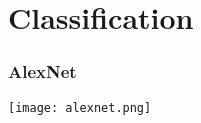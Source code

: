 \documentclass[../presentation.tex]{subfiles} %
\begin{document}
\section{Classification}

\begin{frame}

    \frametitle{AlexNet}

        \vspace{-0.7cm}
		\begin{center}
			\texttt{[image: alexnet.png]}
		\end{center}
        \vspace{-0.7cm}








\end{frame}
\end{document}
